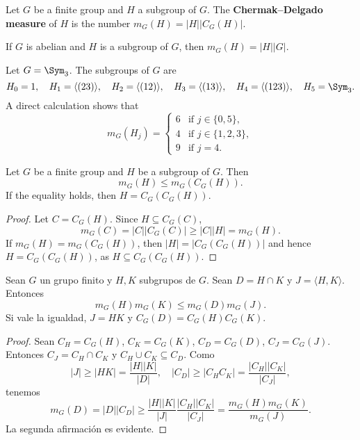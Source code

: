 \label{ChermakDelgado}

\begin{definition}
Let $G$ be a finite group and $H$ a subgroup of $G$. 
The \textbf{Chermak--Delgado measure} of $H$ 
is the number 
$m_G(H)=|H||C_G(H)|$.
\end{definition}

\begin{example}
If $G$ is abelian and $H$ is a subgroup of $G$, then 
$m_G(H)=|H||G|$.
\end{example}

\begin{example}
Let $G=\Sym_3$. The subgroups of $G$ are 
	\[
		H_0=1,\quad
		H_1=\langle (23)\rangle,\quad
		H_2=\langle (12)\rangle,\quad
		H_3=\langle (13)\rangle,\quad
		H_4=\langle (123)\rangle,\quad
		H_5=\Sym_3.
	\]
	A direct calculation shows that 
	\[
		m_G(H_j)=\begin{cases}
			6 & \text{if $j\in\{0,5\}$},\\
			4 & \text{if $j\in\{1,2,3\}$},\\
			9 & \text{if $j=4$}.
		\end{cases}
	\]
\end{example}

\begin{lemma}
\label{lemma:CD1}
Let $G$ be a finite group and $H$ be a subgroup of $G$. Then 
\[
m_G(H)\leq m_G(C_G(H)).
\]
If the equality holds, then $H=C_G(C_G(H))$.
\end{lemma}

\begin{proof}
Let $C=C_G(H)$. 
Since $H\subseteq C_G(C)$, 
\[
m_G(C)=|C||C_G(C)|\geq |C||H|=m_G(H). 
\]
If $m_G(H)=m_G(C_G(H))$, then $|H|=|C_G(C_G(H))|$ and 
hence $H=C_G(C_G(H))$, as $H\subseteq C_G(C_G(H))$. 
\end{proof}

\begin{lemma}
	Sean $G$ un grupo finito y 
	$H,K$ subgrupos de $G$. Sean $D=H\cap K$ y $J=\langle H,K\rangle$. Entonces
	\[
		m_G(H)m_G(K)\leq m_G(D)m_G(J).
	\]
	Si vale la igualdad, $J=HK$ y $C_G(D)=C_G(H)C_G(K)$.
	\label{lemma:CD2}
\end{lemma}

\begin{proof}
	Sean $C_H=C_G(H)$, $C_K=C_G(K)$, $C_D=C_G(D)$, $C_J=C_G(J)$. Entonces
	$C_J=C_H\cap C_K$ y $C_H\cup C_K\subseteq C_D$. Como
	\[
		|J|\geq |HK|=\frac{|H||K|}{|D|},
		\quad
		|C_D|\geq |C_HC_K|=\frac{|C_H||C_K|}{|C_J|},
	\]
	tenemos
	\[
		m_G(D)
		=|D||C_D|\geq \frac{|H||K|}{|J|}\frac{|C_H||C_K|}{|C_J|}
		=\frac{m_G(H)m_G(K)}{m_G(J)}.
	\]
	La segunda afirmación es evidente. 
\end{proof}

